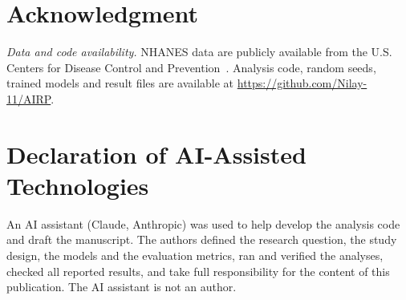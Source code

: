 \documentclass[journal]{IEEEtran}
\begin{document}
\section*{Acknowledgment}
\textit{Data and code availability.} NHANES data are publicly available from the U.S. Centers for Disease Control and Prevention~\cite{nhanes}. Analysis code, random seeds, trained models and result files are available at \url{https://github.com/Nilay-11/AIRP}.


\section*{Declaration of AI-Assisted Technologies}
An AI assistant (Claude, Anthropic) was used to help develop the analysis code and draft the manuscript. The authors defined the research question, the study design, the models and the evaluation metrics, ran and verified the analyses, checked all reported results, and take full responsibility for the content of this publication. The AI assistant is not an author.



\end{document}
